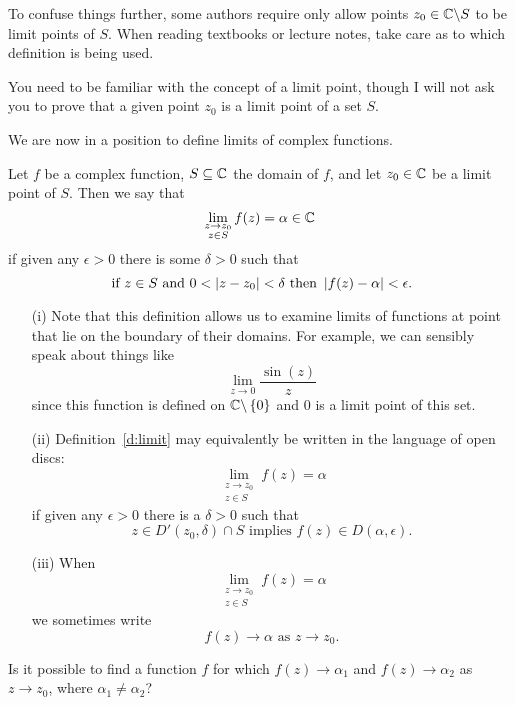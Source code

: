 \begin{note}
To confuse things further, some authors require only allow points $z_0 \in \mathbb{C} \backslash S$ to be limit points of $S$.  When reading textbooks or lecture notes, take care as to which definition is being used.

You need to be familiar with the concept of a limit point, though I will not ask you to prove that a given point $z_0$ is a limit point of a set $S$.
\end{note}

We are now in a position to define limits of complex functions.
\begin{definition}
\label{d:limit}
Let $f$ be a complex function, $S \subseteq \mathbb{C}$ the domain of $f$,  and let $z_0 \in \mathbb{C}$ be a limit point of $S$. Then we say that \[ \lim_{\substack{z \to z_0 \\ z \in S}} f(z) = \alpha \in \mathbb{C}\] if given any $\epsilon >0$ there is some $\delta >0$ such that
\[ \text{ if $z \in S$ and } 0<\left| z-z_0 \right| < \delta \text{ then }\left| f(z)-\alpha \right|< \epsilon.\]
\end{definition}
 
 

\begin{note}

\begin{enumerate}
\item[(i)]  Note that this definition allows us to examine limits of functions at point that lie on the boundary of their domains.  For example, we can sensibly speak about things like
\[
\lim_{z \to 0} \frac{\sin(z)}{z}
\] 
since this function is defined on $\mathbb{C} \backslash \left\{0\right\}$ and $0$ is a limit point of this set.
\item[(ii)]  Definition~\ref{d:limit} may equivalently be written in the language of open discs: 
\[
\lim_{\substack{z \to z_0 \\ z \in S}} f(z) = \alpha
\]
if given any $\epsilon >0$ there is a $\delta >0 $ such that
\[
z \in D' (z_0, \delta ) \cap S \text{ implies } f(z) \in D( \alpha, \epsilon).
\]
\item[(iii)] When
\[ \lim_{\substack{z \to z_0 \\ z \in S}} f(z) = \alpha \]
we sometimes write
\[
f(z) \to \alpha \text{ as } z \to z_0.
\]
\end{enumerate}

\end{note} 


 \begin{question}
 Is it possible to find a function $f$ for which $f(z) \to \alpha_1$ and $f(z) \to \alpha_2$ as $z \to z_0$, where $\alpha_1\neq\alpha_2$?
  \end{question}
  
